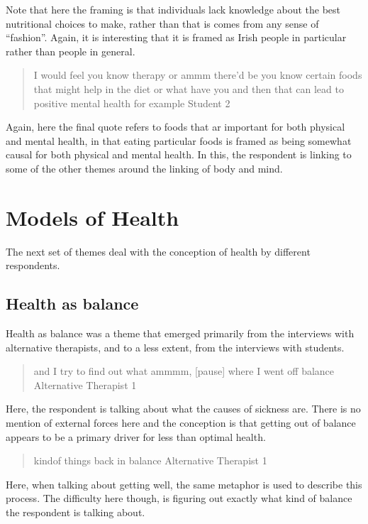 Note that here the framing is that individuals lack knowledge about the best nutritional choices to make, rather than that is comes from any sense of ``fashion''. Again, it is interesting that it is framed as Irish people in particular rather than people in general. 

\begin{quotation}
   I would feel you know therapy or ammm there'd be you know certain foods that might help in the diet or what have you and then that can lead to positive mental health for example
Student 2
\end{quotation}

Again, here the final quote refers to foods that ar important for both physical and mental health, in that eating particular foods is framed as being somewhat causal for both physical and mental health. In this, the respondent is linking to some of the other themes around the linking of body and mind. 

\section{Models of Health}
\label{sec:models-health}

The next set of themes deal with the conception of health by different respondents. 

\subsection{Health as balance}
\label{sec:health-as-balance}

Health as balance was a theme that emerged primarily from the interviews with alternative therapists, and to a less extent, from the interviews with students. 

\begin{quotation}
  and I try to find out what ammmm, [pause] where I went off balance 
Alternative Therapist 1
\end{quotation}

Here, the respondent is talking about what the causes of sickness are. There is no mention of external forces here and the conception is that getting out of balance appears to be a primary driver for less than optimal health. 

\begin{quotation}
  kindof things back in balance
Alternative Therapist 1
\end{quotation}

Here, when talking about getting well, the same metaphor is used to describe this process. The difficulty here though, is figuring out exactly what kind of balance the respondent is talking about. 

